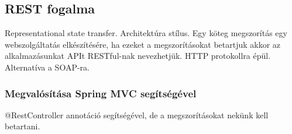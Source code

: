 \documentclass[a4paper,14pt]{extarticle}
\begin{document}
		\subsection{REST fogalma}
		Representational state transfer. Architektúra stílus. Egy köteg megszorítás egy webszolgáltatás elkészítésére, ha ezeket a megszorításokat betartjuk akkor az alkalmazásunkat APIt RESTful-nak nevezhetjük.
		HTTP protokollra épül. Alternatíva a SOAP-ra.
			\subsubsection{Megvalósítása Spring MVC segítségével}
			@RestController annotáció segítségével, de a megszorításokat nekünk kell betartani.
\end{document}
